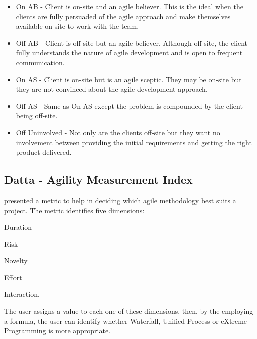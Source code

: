 \begin{itemize}
\item On AB - Client is on-site and an agile believer. This is the ideal when the clients are fully persuaded of the agile approach and make themselves available on-site to work with the team.
\item Off AB - Client is off-site but an agile believer. Although off-site, the client fully understands the nature of agile development and is open to frequent communication.
\item On AS - Client is on-site but is an agile sceptic. They may be on-site but they are not convinced about the agile development approach.
\item Off AS - Same as On AS except the problem is compounded by the client being off-site.
\item Off Uninvolved - Not only are the clients off-site but they want no involvement between providing the initial requirements and getting the right product delivered.
\end{itemize}

\subsection{Datta - Agility Measurement Index} %
\citet{datta_dissertation} presented a metric to help in deciding which agile methodology best suits a project. The metric identifies five dimensions: 
\begin{inparaenum} [a\upshape)]
\item Duration
\item Risk
\item Novelty
\item Effort
\item Interaction.
\end{inparaenum}
The user assigns a value to each one of these dimensions, then, by the employing a formula, the user can identify whether Waterfall, Unified Process or eXtreme Programming is more appropriate.

